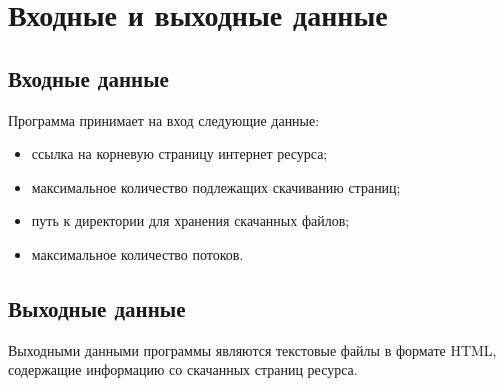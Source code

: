 \chapter{Входные и выходные данные}

\section{Входные данные}

Программа принимает на вход следующие данные:
\begin{itemize}[label=--]
    \item ссылка на корневую страницу интернет ресурса;
    \item максимальное количество подлежащих скачиванию страниц;
    \item путь к директории для хранения скачанных файлов;
    \item максимальное количество потоков.
\end{itemize}

\section{Выходные данные}

Выходными данными программы являются текстовые файлы в формате HTML, содержащие информацию со скачанных страниц ресурса.